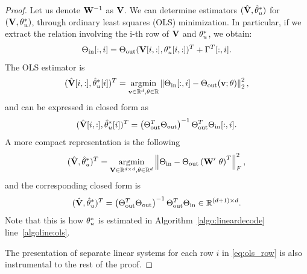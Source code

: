 \begin{proof}
Let us denote $\mathbf{W}^{-1}$ as $\mathbf{V}$.
We can determine estimators $(\hat{\mathbf{V}}, \hat{\theta}^*_u)$ for $(\mathbf{V}, \theta^*_u)$, through ordinary least squares (OLS)  minimization. In particular, if we extract the relation involving the i-th row of $\mathbf{V}$ and $\theta_u^*$, we obtain:
\begin{equation}
\label{eq:ols_row}
\Theta_{\text{in}}[:,i] = \Theta_{\text{out}}(\mathbf{V}[i,:], \theta^*_u[i,:])^T + \Gamma^T[:,i].
\end{equation}
The OLS estimator is 
\begin{equation}
(\hat{\mathbf{V}}[i,:],\hat{\theta}^*_u[i])^T = \operatorname*{argmin}_{\mathbf{v} \in \mathbb{R}^d, \theta \in \mathbb{R} }\left\lVert\Theta_{\text{in}}[:,i] - \Theta_{\text{out}}(\mathbf{v}; \theta) \right\rVert_2^2,
\end{equation}
and can be expressed in closed form as
\begin{equation}
    (\hat{\mathbf{V}}[i,:],\hat{\theta}^*_u[i])^T= \left(\Theta_{\text{out}}^T\Theta_{\text{out}}\right)^{-1}\Theta_{\text{out}}^T \Theta_{\text{in}}[:,i].
\end{equation}
A more compact representation is the following
\begin{align*}
    (\hat{\mathbf{V}}, \hat{\theta}^*_u)^T
  =\operatorname*{argmin}_{\mathbf{V}\in \mathbb{R}^{d\times d},\theta\in \mathbb{R}^{d}} \left\lVert \Theta_{\text{in}}- \Theta_{\text{out}} 
   \left( \mathbf{W}' \,\, \theta \right)^T 
     \right\rVert^2_F,
 \end{align*}
and the corresponding closed form is 
\begin{equation} \label{eq:estimate_wv}
     (\hat{\mathbf{V}}, \hat{\theta}^*_u)^T = \left(\Theta_{\text{out}}^T\Theta_{\text{out}}\right)^{-1}\Theta_{\text{out}}^T \Theta_{\text{in}} \in \mathbb{R}^{(d+1)\times d}.
 \end{equation}
Note that this is how $\theta_u^*$ is estimated in Algorithm~\ref{algo:lineardecode}  line~\ref{algoline:ols}.

The presentation of separate linear systems for each row $i$ in \eqref{eq:ols_row} is also instrumental to the rest of the proof.



\end{proof}
